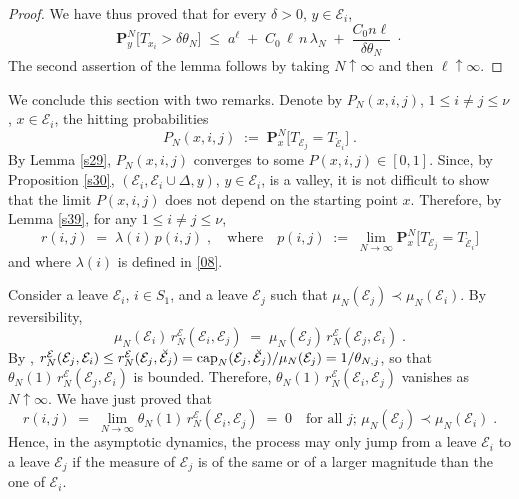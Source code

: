 \documentclass[reqno]{amsart}
\begin{document}
\begin{proof}
We have thus proved that for every $\delta>0$, $y\in{{\mathcal E}}_i$,
\begin{equation*}
{{\mathbf P}}^N_y \big[ T_{x_i} > \delta \theta_N \big] \;\le\;
a^\ell \;+\; C_0\, \ell \,n\, \lambda_N \;+\; \frac{C_0 n\ell}{\delta
  \theta_N}\; \cdot
\end{equation*}
The second assertion of the lemma follows by taking $N\uparrow\infty$
and then $\ell\uparrow\infty$.
\end{proof}

We conclude this section with two remarks. Denote by $P_N(x,i,j)$,
$1\le i\not = j\le \nu$, $x\in {{\mathcal E}}_i$, the hitting
probabilities
\begin{equation*}
P_N(x,i,j) \;:=\; 
{{\mathbf P}}^N_x \big[ T_{{{\mathcal E}}_j} = T_{\breve{{{\mathcal E}}}_i} \big]\;.
\end{equation*}
By Lemma \ref{s29}, $P_N(x,i,j)$ converges to some $P(x,i,j)\in
[0,1]$. Since, by Proposition \ref{s30}, $({{\mathcal E}}_i, {{\mathcal E}}_i \cup \Delta,
y)$, $y\in {{\mathcal E}}_i$, is a valley, it is not difficult to show that the
limit $P(x,i,j)$ does not depend on the starting point $x$. Therefore,
by Lemma \ref{s39}, for any $1\le i\not = j\le \nu$,
\begin{equation}
\label{41a}
r(i,j) \;=\; \lambda(i) \,p(i,j)\;, \quad \text{where}
\quad p(i,j) \;:=\; \lim_{N\to\infty}
{{\mathbf P}}^N_x \big[ T_{{{\mathcal E}}_j} = T_{\breve{{{\mathcal E}}}_i} \big]
\end{equation}
and where $\lambda(i)$ is defined in \eqref{08}.

Consider a leave ${{\mathcal E}}_i$, $i\in S_1$, and a leave ${{\mathcal E}}_j$ such
that $\mu_N({{\mathcal E}}_j) \prec \mu_N({{\mathcal E}}_i)$. By reversibility,
\begin{equation*}
\mu_N({{\mathcal E}}_i) \, r^{{{\mathcal E}}}_N({{\mathcal E}}_i, {{\mathcal E}}_j) \;=\; \mu_N({{\mathcal E}}_j) 
\, r^{{{\mathcal E}}}_N({{\mathcal E}}_j, {{\mathcal E}}_i) \;.
\end{equation*}
By \cite[Lemma 6.7]{bl2}, $r^{{{\mathcal E}}}_N({{\mathcal E}}_j, {{\mathcal E}}_i) \le r^{{{\mathcal E}}}_N({{\mathcal E}}_j, \breve{{{\mathcal E}}}_j) = {{\rm cap}}_N({{\mathcal E}}_j, \breve{{{\mathcal E}}}_j)/\mu_N({{\mathcal E}}_j) = 1/\theta_{N,j}$, so that $\theta_N(1) \,
r^{{{\mathcal E}}}_N({{\mathcal E}}_j, {{\mathcal E}}_i)$ is bounded. Therefore, $\theta_N(1) \,
r^{{{\mathcal E}}}_N({{\mathcal E}}_i, {{\mathcal E}}_j)$ vanishes as $N\uparrow\infty$. We have
just proved that
\begin{equation}
\label{10}
r(i,j)\;=\; \lim_{N\to\infty} \theta_N(1) \, r^{{{\mathcal E}}}_N({{\mathcal E}}_i, {{\mathcal E}}_j) \;=\; 0
\quad \text{for all $j$; } \mu_N({{\mathcal E}}_j) \prec \mu_N({{\mathcal E}}_i)\; .
\end{equation}
Hence, in the asymptotic dynamics, the process may only jump from a
leave ${{\mathcal E}}_i$ to a leave ${{\mathcal E}}_j$ if the measure of ${{\mathcal E}}_j$ is of
the same or of a larger magnitude than the one of ${{\mathcal E}}_i$.
\end{document}
